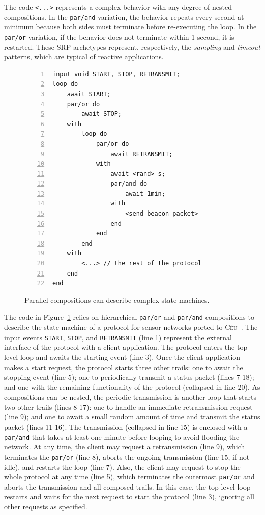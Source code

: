 \documentclass{acm_proc_article-sp}
\newcommand{\CEU}{\textsc{C\'{e}u}\xspace}
\newcommand{\code}[1] {{\small{\texttt{#1}}}}
\newcommand{\1}{\;}
\newcommand{\2}{\;\;}
\newcommand{\3}{\;\;\;}
\newcommand{\5}{\;\;\;\;\;}
\begin{document}
The code \code{<...>} represents a complex behavior with any degree of nested 
compositions.
%
In the \code{par/and} variation, the behavior repeats every second at minimum 
because both sides must terminate before re-executing the loop.
In the \code{par/or} variation, if the behavior does not terminate within 1 
second, it is restarted.
%
These SRP archetypes represent, respectively, the \emph{sampling} and 
\emph{timeout} patterns, which are typical of reactive applications.


\begin{figure}[t]
\begin{lstlisting}[numbers=left,xleftmargin=3em]
input void START, STOP, RETRANSMIT;
loop do
    await START;
    par/or do
        await STOP;
    with
        loop do
            par/or do
                await RETRANSMIT;
            with
                await <rand> s;
                par/and do
                    await 1min;
                with
                    <send-beacon-packet>
                end
            end
        end
    with
        <...> // the rest of the protocol
    end
end
\end{lstlisting}
\caption{ Parallel compositions can describe complex state machines.
\label{lst.ctp}
}
\end{figure}

The code in Figure~\ref{lst.ctp} relies on hierarchical \code{par/or} and 
\code{par/and} compositions to describe the state machine of a protocol for 
sensor networks ported to \CEU~\cite{wsn.ctp,ceu.sensys13}.
%
The input events \code{START}, \code{STOP}, and \code{RETRANSMIT} (line 1) 
represent the external interface of the protocol with a client application.
%
The protocol enters the top-level loop and awaits the starting event (line 3).
Once the client application makes a start request, the protocol starts three 
other trails:
one to await the stopping event (line 5);
one to periodically transmit a status packet (lines 7-18);
and one with the remaining functionality of the protocol (collapsed in line 
20).
%
As compositions can be nested, the periodic transmission is another loop that 
starts two other trails (lines 8-17):
one to handle an immediate retransmission request (line 9);
and one to await a small random amount of time and transmit the status packet 
(lines 11-16).
%
The transmission (collapsed in line 15) is enclosed with a \code{par/and} that 
takes at least one minute before looping to avoid flooding the network.
%
At any time, the client may request a retransmission (line 9), which terminates 
the \code{par/or} (line 8), aborts the ongoing transmission (line 15, if not 
idle), and restarts the loop (line 7).
%
Also, the client may request to stop the whole protocol at any time (line 5), 
which terminates the outermost \code{par/or} and aborts the transmission and 
all composed trails.
In this case, the top-level loop restarts and waits for the next request to 
start the protocol (line 3), ignoring all other requests as specified.
\end{document}
